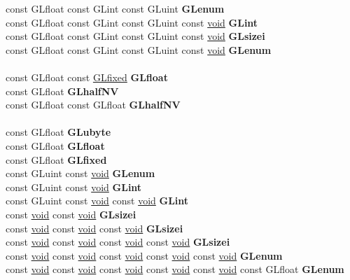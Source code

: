 \begin{DoxyCompactItemize}
\begin{tabbing}
\>const GLfloat const GLint const GLuint {\bfseries GLenum}\\
\>const GLfloat const GLint const GLuint const \hyperlink{interfacevoid}{void} {\bfseries GLint}\\
\>const GLfloat const GLint const GLuint const \hyperlink{interfacevoid}{void} {\bfseries GLsizei}\\
\>const GLfloat const GLint const GLuint const \hyperlink{interfacevoid}{void} {\bfseries GLenum}\\
\\
\>const GLfloat const \hyperlink{glheader_8h_ad6d3fa892df40dedf48ee6d84529ae5e}{GLfixed} {\bfseries GLfloat}\\
\>const GLfloat {\bfseries GLhalfNV}\\
\>const GLfloat const GLfloat {\bfseries GLhalfNV}\\
\\
\>const GLfloat {\bfseries GLubyte}\\
\>const GLfloat {\bfseries GLfloat}\\
\>const GLfloat {\bfseries GLfixed}\\
\>const GLuint const \hyperlink{interfacevoid}{void} {\bfseries GLenum}\\
\>const GLuint const \hyperlink{interfacevoid}{void} {\bfseries GLint}\\
\>const GLuint const \hyperlink{interfacevoid}{void} const \hyperlink{interfacevoid}{void} {\bfseries GLint}\\
\>const \hyperlink{interfacevoid}{void} const \hyperlink{interfacevoid}{void} {\bfseries GLsizei}\\
\>const \hyperlink{interfacevoid}{void} const \hyperlink{interfacevoid}{void} const \hyperlink{interfacevoid}{void} {\bfseries GLsizei}\\
\>const \hyperlink{interfacevoid}{void} const \hyperlink{interfacevoid}{void} const \hyperlink{interfacevoid}{void} const \hyperlink{interfacevoid}{void} {\bfseries GLsizei}\\
\>const \hyperlink{interfacevoid}{void} const \hyperlink{interfacevoid}{void} const \hyperlink{interfacevoid}{void} const \hyperlink{interfacevoid}{void} const \hyperlink{interfacevoid}{void} {\bfseries GLenum}\\
\>const \hyperlink{interfacevoid}{void} const \hyperlink{interfacevoid}{void} const \hyperlink{interfacevoid}{void} const \hyperlink{interfacevoid}{void} const \hyperlink{interfacevoid}{void} const GLfloat {\bfseries GLenum}\\

\end{tabbing}
\end{DoxyCompactItemize}
